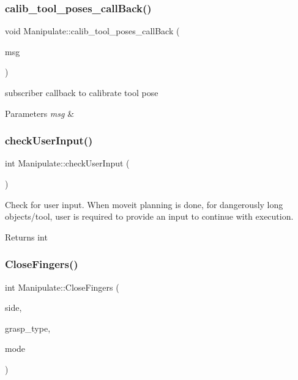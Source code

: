 \subsubsection{\texorpdfstring{calib\+\_\+tool\+\_\+poses\+\_\+call\+Back()}{calib\_tool\_poses\_callBack()}}
{\footnotesize\ttfamily void Manipulate\+::calib\+\_\+tool\+\_\+poses\+\_\+call\+Back (\begin{DoxyParamCaption}\item[{const geometry\+\_\+msgs\+::\+Pose\+Array\+::\+Ptr \&}]{msg }\end{DoxyParamCaption})\hspace{0.3cm}{\ttfamily [private]}}



subscriber callback to calibrate tool pose 


\begin{DoxyParams}{Parameters}
{\em msg} & \\
\hline
\end{DoxyParams}
\mbox{\label{structManipulate_a581e8cd0fc68f7191da0a46bc888d5c6}} 
\subsubsection{\texorpdfstring{check\+User\+Input()}{checkUserInput()}}
{\footnotesize\ttfamily int Manipulate\+::check\+User\+Input (\begin{DoxyParamCaption}{ }\end{DoxyParamCaption})\hspace{0.3cm}{\ttfamily [private]}}



Check for user input. When moveit planning is done, for dangerously long objects/tool, user is required to provide an input to continue with execution. 

\begin{DoxyReturn}{Returns}
int 
\end{DoxyReturn}
\mbox{\label{structManipulate_ad3176a1acd09b15e80a5455b4df47515}} 
\subsubsection{\texorpdfstring{Close\+Fingers()}{CloseFingers()}}
{\footnotesize\ttfamily int Manipulate\+::\+Close\+Fingers (\begin{DoxyParamCaption}\item[{std\+::string}]{side,  }\item[{int}]{grasp\+\_\+type,  }\item[{int}]{mode }\end{DoxyParamCaption})\hspace{0.3cm}{\ttfamily [private]}}



